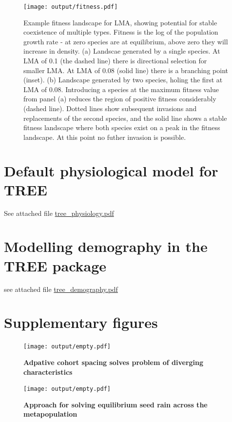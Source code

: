 \documentclass[]{article}
\begin{document}
\begin{figure}[h!]
\centering
\texttt{[image: output/fitness.pdf]}
\caption{Example fitness landscape for LMA, showing potential for stable coexistence of multiple types.  Fitness is the log of the population growth rate - at zero species are at equilibrium, above zero they will increase in density.  (a) Landscae generated by a single species.  At LMA of 0.1 (the dashed line) there is directional selection for smaller LMA.  At LMA of 0.08 (solid line) there is a branching point (inset).  (b) Landscape generated by two species, holing the first at LMA of 0.08. Introducing a species at the maximum fitness value from panel (a) reduces the region of positive fitness considerably (dashed line).  Dotted lines show subsequent invasions and replacements of the second species, and the solid line shows a stable fitness landscape where both species exist on a peak in the fitness landscape.  At this point no futher invasion is possible.}
\label{fig:fitness}
\end{figure}

\clearpage

\begin{appendices}\label{sec:appendices}
\renewcommand{\thefigure}{S\arabic{figure}}
\renewcommand{\thetable}{S\arabic{table}}

\setcounter{figure}{0}
\setcounter{table}{0}


\section{Default physiological model for TREE}\label{sec:FFW16}

See attached file \url{tree_physiology.pdf}

\section{Modelling demography in the TREE package}\label{sec:demography}

see attached file \url{tree_demography.pdf}


\section{Supplementary figures}\label{supplementary-figures}

\begin{figure}[h!]
\centering
\texttt{[image: output/empty.pdf]}
\caption{\textbf{Adpative cohort spacing solves problem of diverging characteristics}}
\label{fig:characteristics}
\end{figure}

\newpage

\begin{figure}[h!]
\centering
\texttt{[image: output/empty.pdf]}
\caption{\textbf{Approach for solving equilibrium seed rain across the metapopulation }}
\label{fig:seed_rain}
\end{figure}

\end{appendices}
\end{document}

